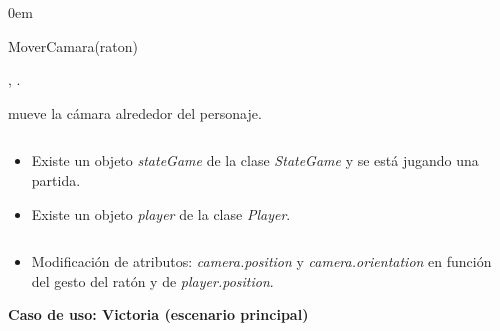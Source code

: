 \begin{description}
    \itemsep0em
    \item [Operación] MoverCamara(raton)
    \item [Actores] \jugador, \sistema.
    \item [Responsabilidades] mueve la cámara alrededor del personaje.
    \item [Precondiciones] $\quad$
        \begin{itemize}
            \itemsep0em
            \item Existe un objeto \textit{stateGame} de la clase \textit{StateGame}
            y se está jugando una partida.
            \item Existe un objeto \textit{player} de la clase \textit{Player}.
        \end{itemize}
    \item [Postcondiciones] $\quad$
        \begin{itemize}
            \itemsep0em
            \item Modificación de atributos: \textit{camera.position} y
            \textit{camera.orientation} en función del gesto del ratón
            y de \textit{player.position}.\\
        \end{itemize}
\end{description}


\textbf{Caso de uso: Victoria (escenario principal)}


